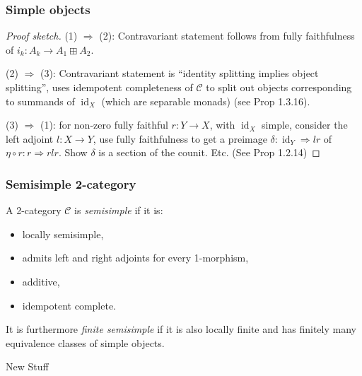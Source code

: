 \documentclass{beamer}
\DeclareMathOperator{\id}{id}
\newcommand{\cC}{{\mathcal{C}}}
\begin{document}
\begin{frame}
\frametitle{Simple objects}

\begin{proof}[Proof sketch]
(1) $\Rightarrow$ (2): Contravariant statement
follows from fully faithfulness of
$i_k: A_k \to A_1 \boxplus A_2$.

\pause

(2) $\Rightarrow$ (3): Contravariant statement is
``identity splitting implies object splitting'',
uses idempotent completeness of $\cC$
to split out objects corresponding to summands of $\id_X$
(which are separable monads)
(see \cite{DRfusion}{Prop 1.3.16}).

\pause

(3) $\Rightarrow$ (1): for non-zero fully faithful $r: Y \to X$,
with $\id_X$ simple,
consider the left adjoint $l: X \to Y$,
use fully faithfulness to get a preimage
$\delta : \id_Y \Rightarrow lr$ of
$\eta \circ r: r \Rightarrow rlr$.
Show $\delta$ is a section of the counit. Etc.
(See \cite{DRfusion}{Prop 1.2.14})
\end{proof}

\end{frame}

\begin{frame}
\frametitle{Semisimple 2-category}

\begin{definition}

\pause

A 2-category $\cC$ is \emph{semisimple}
if it is:
\begin{itemize}
\item locally semisimple,
\item admits left and right adjoints for every 1-morphism,
\item additive,
\item idempotent complete.
\end{itemize}

It is furthermore \emph{finite semisimple}
if it is also locally finite and
has finitely many equivalence classes of simple objects.
\end{definition}

\end{frame}


\begin{frame}

\begin{center}
\Huge New Stuff
\end{center}

\end{frame}
\end{document}

